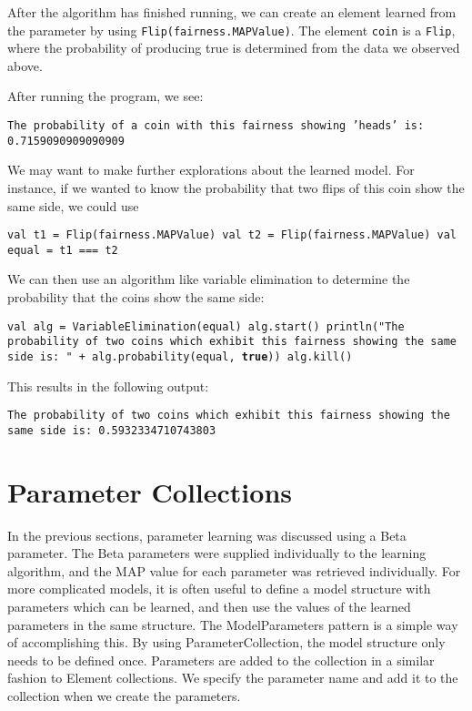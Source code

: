 After the algorithm has finished running, we can create an element learned from the parameter by using \texttt{Flip(fairness.MAPValue)}. The element \texttt{coin} is a \texttt{Flip}, where the probability of producing true is determined from the data we observed above.

After running the program, we see:

\begin{flushleft}
\texttt{The probability of a coin with this fairness showing 'heads' is:
0.7159090909090909}
\end{flushleft}

We may want to make further explorations about the learned model. For instance, if we wanted to know the probability that two flips of this coin show the same side, we could use

\begin{flushleft}
\texttt{val t1 = Flip(fairness.MAPValue) 
\newline val t2 = Flip(fairness.MAPValue) 
\newline val equal = t1 === t2}
\end{flushleft}

We can then use an algorithm like variable elimination to determine the probability that the coins show the same side:

\begin{flushleft}
\texttt{val alg = VariableElimination(equal)
\newline alg.start()
\newline println("The probability of two coins which exhibit this fairness showing the same side is: " + alg.probability(equal, \textbf{true}))
\newline alg.kill()
}
\end{flushleft}

This results in the following output:

\begin{flushleft}
\texttt{The probability of two coins which exhibit this fairness showing the same side is: 0.5932334710743803}
\end{flushleft}

\section{Parameter Collections}

In the previous sections, parameter learning was discussed using a Beta parameter. The Beta parameters were supplied individually to the learning algorithm, and the MAP value for each parameter was retrieved individually. For more complicated models, it is often useful to define a model structure with parameters which can be learned, and then use the values of the learned parameters in the same structure. The ModelParameters pattern is a simple way of accomplishing this. By using ParameterCollection, the model structure only needs to be defined once. Parameters are added to the collection in a similar fashion to Element collections. We specify the parameter name and add it to the collection when we create the parameters.

